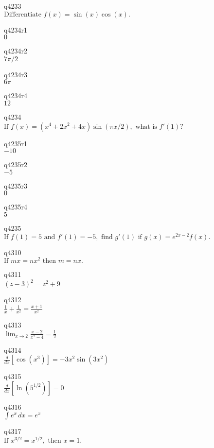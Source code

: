 q4233\\
\(\displaystyle \text{Differentiate } f(x) = \sin(x) \cos(x). \)

q4234r1\\
\(\displaystyle 0 \)

q4234r2\\
\(\displaystyle 7\pi/2 \)

q4234r3\\
\(\displaystyle 6\pi \)

q4234r4\\
\(\displaystyle 12 \)

q4234\\
\(\displaystyle \text{If } f(x) = (x^4 + 2x^2 + 4x) \sin(\pi x / 2), \text{ what is } f'(1)? \)

q4235r1\\
\(\displaystyle -10 \)

q4235r2\\
\(\displaystyle -5 \)

q4235r3\\
\(\displaystyle 0 \)

q4235r4\\
\(\displaystyle 5 \)

q4235\\
\(\displaystyle \text{If } f(1) = 5 \text{ and } f'(1) = -5, \text{ find } g'(1) \text{ if } g(x) = e^{2x-2} f(x). \)

q4310\\
\(\displaystyle \text{If } mx = nx^2 \text{ then } m = nx. \)

q4311\\
\(\displaystyle (z-3)^2 = z^2 + 9 \)

q4312\\
\(\displaystyle \frac{1}{x} + \frac{1}{x^2} = \frac{x+1}{x^2} \)

q4313\\
\(\displaystyle \lim_{x \rightarrow 2} \frac{x-2}{x^2-4} = \frac{1}{2} \)

q4314\\
\(\displaystyle \frac{d}{dx} [\cos(x^3)] = -3x^2\sin(3x^2) \)

q4315\\
\(\displaystyle \frac{d}{dx} [\ln(5^{1/2})] = 0 \)

q4316\\
\(\displaystyle \int e^x \, dx = e^x \)

q4317\\
\(\displaystyle \text{If } x^{3/2} = x^{1/2}, \text{ then } x = 1. \)

